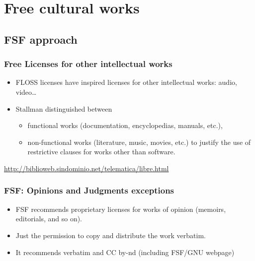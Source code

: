 \documentclass{beamer}
\begin{document}

\section{Free cultural works}

\subsection{FSF approach}

\begin{frame}
\frametitle{Free Licenses for other intellectual works}

\begin{itemize}
\item FLOSS licenses have inspired licenses for other intellectual
  works: audio, video\ldots 

\item Stallman distinguished between 
	\begin{itemize}
	\item \alert{functional works} (documentation, encyclopedias, manuals, etc.), 
	\item \alert{non-functional works} (literature, music, movies, etc.) to justify the use of restrictive clauses for works other than software.\\\pause
	\end{itemize}
\end{itemize}

\bigskip

\begin{center}
\footnotesize{\url{http://biblioweb.sindominio.net/telematica/libre.html}}
\end{center}

\end{frame}

\begin{frame}
\frametitle{FSF: Opinions and Judgments exceptions}
\begin{itemize}
\item \alert{FSF recommends proprietary licenses} for \alert{works of opinion} (memoirs, editorials, and so on).
\item Just the permission to copy and distribute the work \alert{verbatim}.
\item It recommends \alert{verbatim} and \alert{CC by-nd} (including FSF/GNU webpage)
\end{itemize}                                                 

\end{frame}
\end{document}
